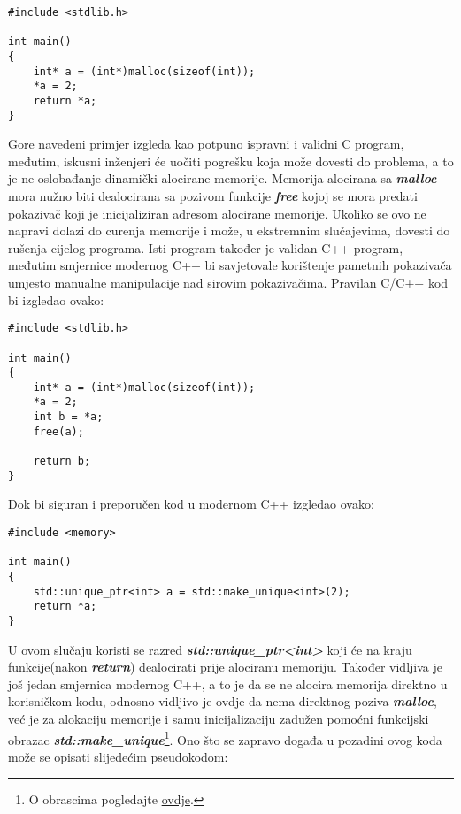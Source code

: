 \lstset{language=C, tabsize=2, frame=single, breaklines=true}
\begin{lstlisting}
#include <stdlib.h>

int main()
{
    int* a = (int*)malloc(sizeof(int));
    *a = 2;
    return *a;
}
\end{lstlisting}
Gore navedeni primjer izgleda kao potpuno ispravni i validni C program, međutim, iskusni inženjeri će uočiti pogrešku koja može dovesti do problema, a to je ne oslobađanje dinamički alocirane memorije. Memorija alocirana sa \textbf{\textit{malloc}} mora nužno biti dealocirana sa pozivom funkcije \textbf{\textit{free}} kojoj se mora predati pokazivač koji je inicijaliziran adresom alocirane memorije. Ukoliko se ovo ne napravi dolazi do curenja memorije i može, u ekstremnim slučajevima, dovesti do rušenja cijelog programa. Isti program također je validan C++ program, međutim smjernice modernog C++ bi savjetovale korištenje pametnih pokazivača umjesto manualne manipulacije nad sirovim pokazivačima. Pravilan C/C++ kod bi izgledao ovako:   
\lstset{language=C, tabsize=2, frame=single, breaklines=true}
\begin{lstlisting}
#include <stdlib.h>

int main()
{
    int* a = (int*)malloc(sizeof(int));
    *a = 2;
    int b = *a;
    free(a);

    return b;
}
\end{lstlisting}
Dok bi siguran i preporučen kod u modernom C++ izgledao ovako:
\lstset{language=C++, tabsize=2, frame=single, breaklines=true}
\begin{lstlisting}
#include <memory>

int main()
{
    std::unique_ptr<int> a = std::make_unique<int>(2);
    return *a;
}
\end{lstlisting}
U ovom slučaju koristi se razred \textbf{\textit{std::unique\_ptr<int>}} koji će na kraju funkcije(nakon \textbf{\textit{return}}) dealocirati prije alociranu memoriju. Također vidljiva je još jedan smjernica modernog C++, a to je da se ne alocira memorija direktno u korisničkom kodu, odnosno vidljivo je ovdje da nema direktnog poziva \textbf{\textit{malloc}}, već je za alokaciju memorije i samu inicijalizaciju zadužen pomoćni funkcijski obrazac \textbf{\textit{std::make\_unique}}\footnote{O obrascima pogledajte \hyperref[subsection:templates]{ovdje}.}. Ono što se zapravo događa u pozadini ovog koda može se opisati slijedećim pseudokodom:
\lstset{language=C++, tabsize=2, frame=single, breaklines=true}
